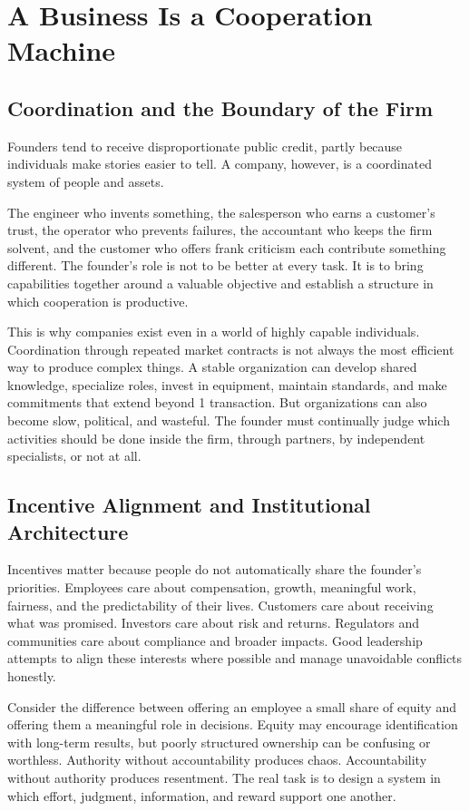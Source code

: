 \section{A Business Is a Cooperation Machine}

\subsection{Coordination and the Boundary of the Firm}

Founders tend to receive disproportionate public credit, partly because individuals make stories easier to tell. A company, however, is a coordinated system of people and assets.

The engineer who invents something, the salesperson who earns a customer's trust, the operator who prevents failures, the accountant who keeps the firm solvent, and the customer who offers frank criticism each contribute something different. The founder's role is not to be better at every task. It is to bring capabilities together around a valuable objective and establish a structure in which cooperation is productive.

This is why companies exist even in a world of highly capable individuals. Coordination through repeated market contracts is not always the most efficient way to produce complex things. A stable organization can develop shared knowledge, specialize roles, invest in equipment, maintain standards, and make commitments that extend beyond 1 transaction. But organizations can also become slow, political, and wasteful. The founder must continually judge which activities should be done inside the firm, through partners, by independent specialists, or not at all.

\subsection{Incentive Alignment and Institutional Architecture}

Incentives matter because people do not automatically share the founder's priorities. Employees care about compensation, growth, meaningful work, fairness, and the predictability of their lives. Customers care about receiving what was promised. Investors care about risk and returns. Regulators and communities care about compliance and broader impacts. Good leadership attempts to align these interests where possible and manage unavoidable conflicts honestly.

Consider the difference between offering an employee a small share of equity and offering them a meaningful role in decisions. Equity may encourage identification with long-term results, but poorly structured ownership can be confusing or worthless. Authority without accountability produces chaos. Accountability without authority produces resentment. The real task is to design a system in which effort, judgment, information, and reward support one another.

